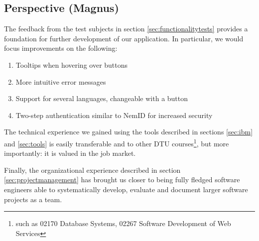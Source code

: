 \subsection{Perspective (Magnus)}

The feedback from the test subjects in section \ref{sec:functionalitytests} provides a foundation for further development of our application. In particular, we would focus improvements on the following:
\begin{enumerate}
    \setlength\itemsep{-0.5em}
    \item Tooltips when hovering over buttons
    \item More intuitive error messages
    \item Support for several languages, changeable with a button
    \item Two-step authentication similar to NemID for increased security
\end{enumerate}

The technical experience we gained using the tools described in sections \ref{sec:ibm} and \ref{sec:tools} is easily transferable and to other DTU courses\footnote{such as 02170 Database Systems, 02267 Software Development of Web Services}, but more importantly: it is valued in the job market. 

Finally, the organizational experience described in section \ref{sec:projectmanagement} has brought us closer to being fully fledged software engineers able to systematically develop, evaluate and document larger software projects as a team.